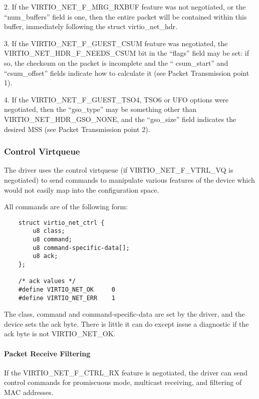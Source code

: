 2. If the VIRTIO_NET_F_MRG_RXBUF feature was not negotiated, or
  the “num_buffers” field is one, then the entire packet will be
  contained within this buffer, immediately following the struct
  virtio_net_hdr.

3. If the VIRTIO_NET_F_GUEST_CSUM feature was negotiated, the
  VIRTIO_NET_HDR_F_NEEDS_CSUM bit in the “flags” field may be
  set: if so, the checksum on the packet is incomplete and the “
  csum_start” and “csum_offset” fields indicate how to calculate
  it (see Packet Transmission point 1).

4. If the VIRTIO_NET_F_GUEST_TSO4, TSO6 or UFO options were
  negotiated, then the “gso_type” may be something other than
  VIRTIO_NET_HDR_GSO_NONE, and the “gso_size” field indicates the
  desired MSS (see Packet Transmission point 2).

\subsubsection{Control Virtqueue}\label{sec:Device Types / Network Device / Device Operation / Control Virtqueue}

The driver uses the control virtqueue (if VIRTIO_NET_F_VTRL_VQ is
negotiated) to send commands to manipulate various features of
the device which would not easily map into the configuration
space.

All commands are of the following form:

\begin{lstlisting}
	struct virtio_net_ctrl {
		u8 class;
		u8 command;
		u8 command-specific-data[];
		u8 ack;
	};

	/* ack values */
	#define VIRTIO_NET_OK     0
	#define VIRTIO_NET_ERR    1
\end{lstlisting}

The class, command and command-specific-data are set by the
driver, and the device sets the ack byte. There is little it can
do except issue a diagnostic if the ack byte is not
VIRTIO_NET_OK.

\paragraph{Packet Receive Filtering}\label{sec:Device Types / Network Device / Device Operation / Control Virtqueue / Packet Receive Filtering}

If the VIRTIO_NET_F_CTRL_RX feature is negotiated, the driver can
send control commands for promiscuous mode, multicast receiving,
and filtering of MAC addresses.

